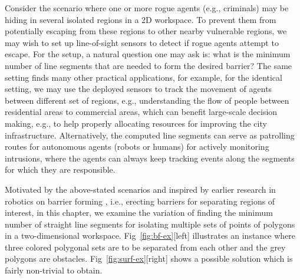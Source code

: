Consider the scenario where one or more rogue agents (e.g., criminals) may be hiding in several isolated regions in a 2D workspace. To prevent them from potentially escaping from these regions to other nearby vulnerable regions, we may wish to set up line-of-sight sensors to detect if rogue agents attempt to escape. For the setup, a natural question one may ask is: what is the minimum number of line segments that are needed to form the desired barrier? The same setting finds many other practical applications, for example, for the identical setting, we may use the deployed sensors to track the movement of agents between different set of regions, e.g., understanding the flow of people between residential areas to commercial areas, which can benefit large-scale decision making, e.g., to help properly allocating resources for improving the city infrastructure. 
%
Alternatively, the computed line segments can serve as patrolling routes for autonomous agents (robots or humans) for actively monitoring intrusions, where the agents can always keep tracking events along the segments for which they are responsible.

%
Motivated by the above-stated scenarios and inspired by earlier research in robotics on barrier forming \cite{kloder2007barrier,kloder2008partial}, i.e., erecting barriers for separating regions of interest, in this chapter, we examine the variation of finding the minimum number of straight line segments for isolating multiple sets of points of polygons in a two-dimensional workspace. 
Fig~\ref{fig:bf-ex}[left] illustrates an instance where three colored polygonal sets are to be separated from each other and the grey polygons are obstacles. Fig~\ref{fig:surf-ex}[right] shows a possible solution which is fairly non-trivial 
to obtain. 
%


